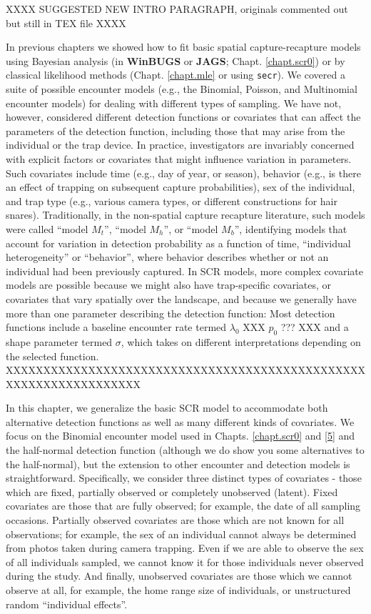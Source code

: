 XXXX SUGGESTED NEW INTRO PARAGRAPH, originals commented out but still in TEX file XXXX

In previous chapters we showed how to fit basic spatial
capture-recapture models using Bayesian analysis (in {\bf WinBUGS} or
{\bf JAGS};
Chapt. \ref{chapt.scr0}) or by classical likelihood methods
(Chapt. \ref{chapt.mle} or using \mbox{\tt secr}). We covered a suite of possible encounter models
(e.g., the Binomial, Poisson, and Multinomial encounter models) for
dealing with different types of sampling. We have not, however,
considered different detection functions or covariates that can affect
the parameters of the detection function, including those that may
arise from the individual or the trap device. In practice, investigators are invariably concerned
with explicit factors or covariates that might influence variation in
parameters. Such covariates
include time (e.g., day of year, or season), behavior (e.g., is there an effect of trapping on subsequent capture probabilities), sex of the individual, and trap
type (e.g., various camera types, or different constructions for hair
snares). Traditionally, in the non-spatial capture recapture
literature, such models were called ``model $M_t$'', ``model
$M_h$'', or ``model $M_b$'', identifying models that account for
variation in detection probability as a function of time, ``individual
heterogeneity'' or ``behavior'', where behavior describes
whether or not an individual had been previously captured. In SCR
models, more complex covariate models are possible because we might
also have trap-specific covariates, or covariates that vary spatially
over the landscape, and because we generally have more than one parameter describing the detection function:
Most detection functions include a baseline encounter
rate termed $\lambda_0$ XXX $p_0$ ??? XXX and a shape parameter
termed $\sigma$, which takes on different interpretations depending on
the selected function. 
XXXXXXXXXXXXXXXXXXXXXXXXXXXXXXXXXXXXXXXXXXXXXXXXXXXXXXXXXXXXXXXXXX

In this chapter, we generalize the basic SCR model to accommodate both alternative detection functions as well as
many different kinds of covariates. We focus on the Binomial encounter
model used in Chapts. \ref{chapt.scr0} and \ref{5} and the half-normal detection function (although we do show you some alternatives to the half-normal),
but the extension to other encounter and detection models is
straightforward.  Specifically, we consider three distinct types of
covariates - those which are fixed, partially observed or completely
unobserved (latent).  Fixed covariates are those that are fully
observed; for example, the date of all sampling occasions.  Partially
observed covariates are those which are not known for all
observations; for example, the sex of an individual cannot always be
determined from photos taken during camera trapping.  Even if we are
able to observe the sex of all individuals sampled, we cannot know it
for those individuals never observed during the study.  And finally,
unobserved covariates are those which we cannot observe at all, for
example, the home range size of individuals, or unstructured random
``individual effects''.


